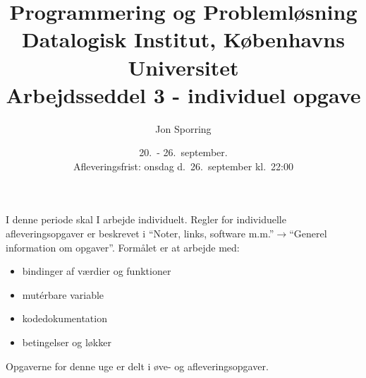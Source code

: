 \documentclass[a4paper,12pt]{article}
\title{Programmering og Problemløsning\\Datalogisk Institut,
  Københavns Universitet\\Arbejdsseddel 3 - individuel opgave}
\author{Jon Sporring}
\date{20.\ - 26.\ september.\\Afleveringsfrist: onsdag d.\ 26.\ september kl.\ 22:00}
\begin{document}
\maketitle

I denne periode skal I arbejde individuelt. Regler for individuelle afleveringsopgaver er beskrevet i "`Noter, links, software m.m."'$\rightarrow$"`Generel information om opgaver"'. Formålet er at arbejde med:
\begin{itemize}
\item bindinger af værdier og funktioner
\item mut\'{e}rbare variable
\item kodedokumentation
\item betingelser og løkker
\end{itemize}

Opgaverne for denne uge er delt i øve- og afleveringsopgaver. 
\end{document}
